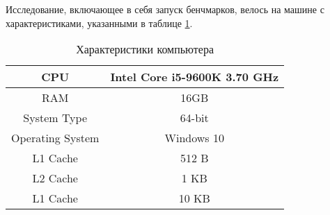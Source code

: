 Исследование, включающее в себя запуск бенчмарков, велось на машине с характеристиками,
указанными в таблице \ref{table:1}.
\begin{table}[h!]
    \centering
    \begin{tabular}{|c|c|}
        \hline
        CPU & Intel Core i5-9600K 3.70 GHz\\
        \hline
        RAM & 16GB \\
        \hline
        System Type & 64-bit\\
        \hline
        Operating System & Windows 10\\
        \hline
        L1 Cache & 512 B\\
        \hline
        L2 Cache & 1 KB\\
        \hline
        L1 Cache & 10 KB\\
        \hline
    \end{tabular}
    \caption{Характеристики компьютера}
    \label{table:1}
\end{table}